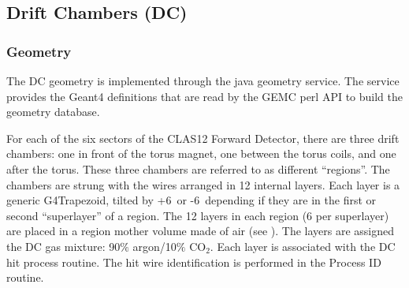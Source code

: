 \subsection{Drift Chambers (DC)}

\subsubsection{Geometry}

The DC geometry is implemented through the java geometry service.
The service provides the Geant4 definitions that are read by the GEMC perl API to build the geometry database.

For each of the six sectors of the CLAS12 Forward Detector, there are three drift chambers: one in front of the torus magnet,
one between the torus coils, and one after the torus.  These three chambers are referred to as different ``regions''.
The chambers are strung with the wires arranged in 12 internal layers.
Each layer is a generic G4Trapezoid, tilted by +6\mdeg \ or -6\mdeg \ depending if they are in the first or second
``superlayer'' of a region.
The 12 layers in each region (6 per superlayer) are placed in a region mother volume made of air (see ).
The layers are assigned the DC gas mixture: 90$\%$ argon/10$\%$ CO$_2$. Each layer is associated with the DC hit process routine.
The hit wire identification is performed in the Process ID routine.

